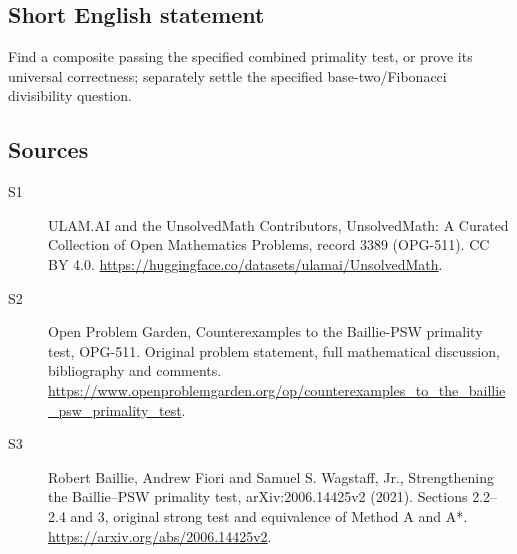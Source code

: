\documentclass[11pt]{article}
\begin{document}
\subsection{Short English statement}
Find a composite passing the specified combined primality test, or prove its universal correctness; separately settle the specified base-two/Fibonacci divisibility question.
\subsection{Sources}
\begin{description}
\item[\hypertarget{source:3389:1}{S1}] ULAM.AI and the UnsolvedMath Contributors, UnsolvedMath: A Curated Collection of Open Mathematics Problems, record 3389 (OPG-511). CC BY 4.0. \url{https://huggingface.co/datasets/ulamai/UnsolvedMath}.
\item[\hypertarget{source:3389:2}{S2}] Open Problem Garden, Counterexamples to the Baillie-PSW primality test, OPG-511. Original problem statement, full mathematical discussion, bibliography and comments. \url{https://www.openproblemgarden.org/op/counterexamples_to_the_baillie_psw_primality_test}.
\item[\hypertarget{source:3389:3}{S3}] Robert Baillie, Andrew Fiori and Samuel S. Wagstaff, Jr., Strengthening the Baillie--PSW primality test, arXiv:2006.14425v2 (2021). Sections 2.2--2.4 and 3, original strong test and equivalence of Method A and A*. \url{https://arxiv.org/abs/2006.14425v2}.
\end{description}
\label{end:3389}
\end{document}
